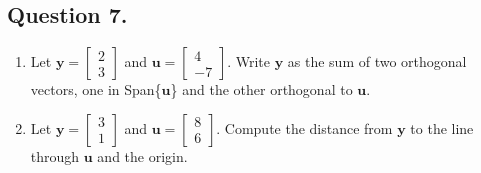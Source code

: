 \documentclass{article}
\begin{document}
\subsection*{Question 7.}
\begin{enumerate} [label=(\arabic*)]
    \item Let $\mathbf{y}=\left[\begin{array}{r}2\\3\end{array}\right]$ and $\mathbf{u}=\left[\begin{array}{r}4\\-7\end{array}\right]$. Write $\mathbf{y}$ as the sum of two orthogonal vectors, one in Span\{$\mathbf{u}$\} and the other orthogonal to $\mathbf{u}$.
    \item Let $\mathbf{y}=\left[\begin{array}{r}3\\1\end{array}\right]$ and $\mathbf{u}=\left[\begin{array}{r}8\\6\end{array}\right]$. Compute the distance from $\mathbf{y}$ to the line through $\mathbf{u}$ and the origin.
\end{enumerate}
\end{document}

